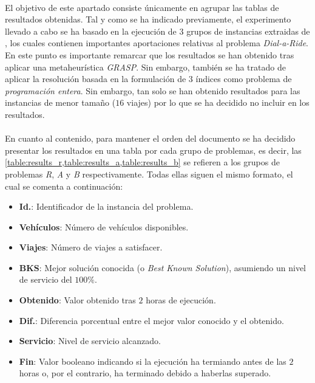 \documentclass{subfiles}
\begin{document}
        \paragraph{}
        El objetivo de este apartado consiste únicamente en agrupar las tablas de resultados obtenidas. Tal y como se ha indicado previamente, el experimento llevado a cabo se ha basado en la ejecución de $3$ grupos de instancias extraidas de \cite{cordeau2003tabu,ropke2007models}, los cuales contienen importantes aportaciones relativas al problema \emph{Dial-a-Ride}. En este punto es importante remarcar que los resultados se han obtenido tras aplicar una metaheurística \emph{GRASP}. Sin embargo, también se ha tratado de aplicar la resolución basada en la formulación de $3$ índices como problema de \emph{programación entera}. Sin embargo, tan solo se han obtenido resultados para las instancias de menor tamaño ($16$ viajes) por lo que se ha decidido no incluir en los resultados.

        \paragraph{}
        En cuanto al contenido, para mantener el orden del documento se ha decidido presentar los resultados en una tabla por cada grupo de problemas, es decir, las \cref{table:results_r,table:results_a,table:results_b} se refieren a los grupos de problemas \emph{R}, \emph{A} y \emph{B} respectivamente. Todas ellas siguen el mismo formato, el cual se comenta a continuación:

        \begin{itemize}
          \item \textbf{Id.}: Identificador de la instancia del problema.
          \item \textbf{Vehículos}: Número de vehículos disponibles.
          \item \textbf{Viajes}: Número de viajes a satisfacer.
          \item \textbf{BKS}: Mejor solución conocida (o \emph{Best Known Solution}), asumiendo un nivel de servicio del $100\%$.
          \item \textbf{Obtenido}: Valor obtenido tras $2$ horas de ejecución.
          \item \textbf{Dif.}: Diferencia porcentual entre el mejor valor conocido y el obtenido.
          \item \textbf{Servicio}: Nivel de servicio alcanzado.
          \item \textbf{Fin}: Valor booleano indicando si la ejecución ha termiando antes de las $2$ horas o, por el contrario, ha terminado debido a haberlas superado.
        \end{itemize}
\end{document}

